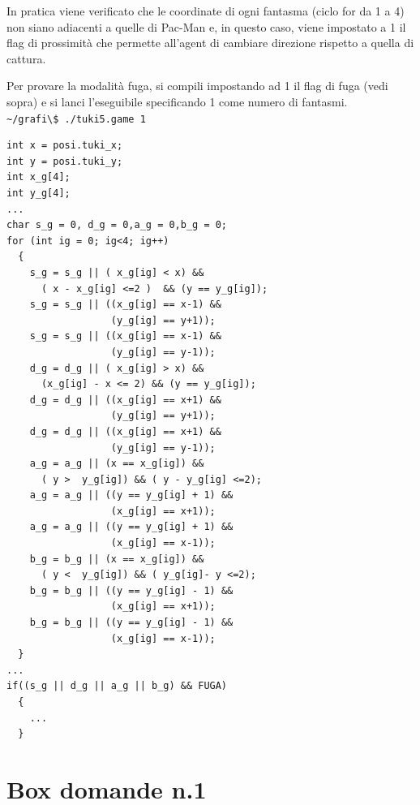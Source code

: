 \documentclass[8pt]{book}
\begin{document}
In pratica viene verificato che le coordinate di ogni fantasma (ciclo for da 1 a 4) non siano adiacenti a quelle di Pac-Man e, in questo caso, viene impostato a 1 il flag di prossimità che permette all'agent di cambiare direzione rispetto a quella di cattura.

Per provare la modalità fuga, si compili impostando ad 1 il flag di fuga (vedi sopra) e si lanci l'eseguibile specificando 1 come numero di fantasmi.\\
\newline
\texttt{\textasciitilde{}/grafi\textbackslash{}\$ ./tuki5.game 1}

  \begin{spacing}{0.9}
    \begin{small}
      \begin{tcolorbox}
\begin{verbatim}
int x = posi.tuki_x;
int y = posi.tuki_y;
int x_g[4];
int y_g[4];
...
char s_g = 0, d_g = 0,a_g = 0,b_g = 0;
for (int ig = 0; ig<4; ig++)
  {
    s_g = s_g || ( x_g[ig] < x) &&
      ( x - x_g[ig] <=2 )  && (y == y_g[ig]); 
    s_g = s_g || ((x_g[ig] == x-1) &&
                  (y_g[ig] == y+1));
    s_g = s_g || ((x_g[ig] == x-1) &&
                  (y_g[ig] == y-1));
    d_g = d_g || ( x_g[ig] > x) &&
      (x_g[ig] - x <= 2) && (y == y_g[ig]);
    d_g = d_g || ((x_g[ig] == x+1) &&
                  (y_g[ig] == y+1));
    d_g = d_g || ((x_g[ig] == x+1) &&
                  (y_g[ig] == y-1));
    a_g = a_g || (x == x_g[ig]) &&
      ( y >  y_g[ig]) && ( y - y_g[ig] <=2);
    a_g = a_g || ((y == y_g[ig] + 1) &&
                  (x_g[ig] == x+1));
    a_g = a_g || ((y == y_g[ig] + 1) &&
                  (x_g[ig] == x-1));
    b_g = b_g || (x == x_g[ig]) &&
      ( y <  y_g[ig]) && ( y_g[ig]- y <=2);
    b_g = b_g || ((y == y_g[ig] - 1) &&
                  (x_g[ig] == x+1));
    b_g = b_g || ((y == y_g[ig] - 1) &&
                  (x_g[ig] == x-1));
  }
...
if((s_g || d_g || a_g || b_g) && FUGA)
  {
    ...
  }
\end{verbatim}
    \end{tcolorbox}
  \end{small}
\end{spacing}

\newpage
\section*{Box domande n.1}
\end{document}
